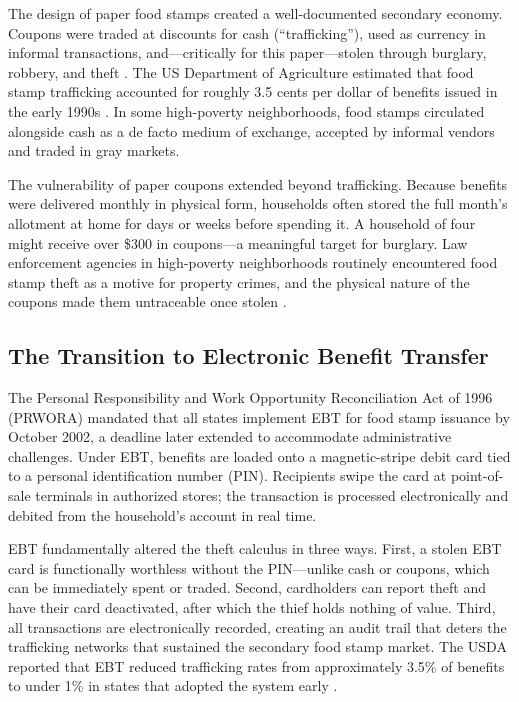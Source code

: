 \documentclass[12pt]{article}
\begin{document}
The design of paper food stamps created a well-documented secondary economy. Coupons were traded at discounts for cash (``trafficking''), used as currency in informal transactions, and---critically for this paper---stolen through burglary, robbery, and theft \citep{usda1999ebt}. The US Department of Agriculture estimated that food stamp trafficking accounted for roughly 3.5 cents per dollar of benefits issued in the early 1990s \citep{macaluso2003extent}. In some high-poverty neighborhoods, food stamps circulated alongside cash as a de facto medium of exchange, accepted by informal vendors and traded in gray markets.

The vulnerability of paper coupons extended beyond trafficking. Because benefits were delivered monthly in physical form, households often stored the full month's allotment at home for days or weeks before spending it. A household of four might receive over \$300 in coupons---a meaningful target for burglary. Law enforcement agencies in high-poverty neighborhoods routinely encountered food stamp theft as a motive for property crimes, and the physical nature of the coupons made them untraceable once stolen \citep{wright2017less}.

\subsection{The Transition to Electronic Benefit Transfer}

The Personal Responsibility and Work Opportunity Reconciliation Act of 1996 (PRWORA) mandated that all states implement EBT for food stamp issuance by October 2002, a deadline later extended to accommodate administrative challenges. Under EBT, benefits are loaded onto a magnetic-stripe debit card tied to a personal identification number (PIN). Recipients swipe the card at point-of-sale terminals in authorized stores; the transaction is processed electronically and debited from the household's account in real time.

EBT fundamentally altered the theft calculus in three ways. First, a stolen EBT card is functionally worthless without the PIN---unlike cash or coupons, which can be immediately spent or traded. Second, cardholders can report theft and have their card deactivated, after which the thief holds nothing of value. Third, all transactions are electronically recorded, creating an audit trail that deters the trafficking networks that sustained the secondary food stamp market. The USDA reported that EBT reduced trafficking rates from approximately 3.5\% of benefits to under 1\% in states that adopted the system early \citep{macaluso2003extent}.
\end{document}
